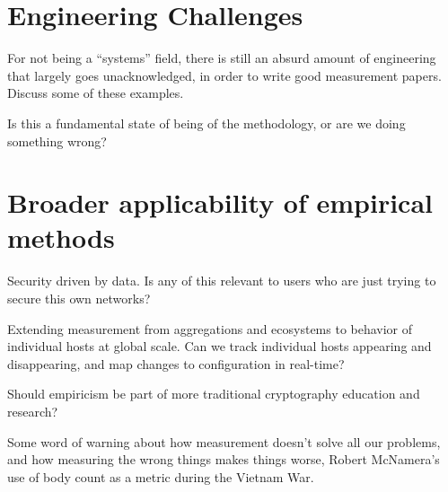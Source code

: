 \section{Engineering Challenges}

For not being a ``systems'' field, there is still an absurd amount of
engineering that largely goes unacknowledged, in order to write good
measurement papers. Discuss some of these examples.

Is this a fundamental state of being of the methodology, or are we doing something wrong?

\section{Broader applicability of empirical methods}

Security driven by data. Is any of this relevant to users who are just trying
to secure this own networks?

Extending measurement from aggregations and ecosystems to behavior of
individual hosts at global scale. Can we track individual hosts appearing and
disappearing, and map changes to configuration in real-time?

Should empiricism be part of more traditional cryptography education and research?

Some word of warning about how measurement doesn't solve all our problems,
and how measuring the wrong things makes things worse, \eg Robert McNamera's
use of body count as a metric during the Vietnam War.






